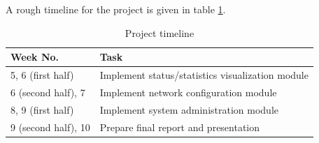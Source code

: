 \documentclass{sig-alternate-05-2015}
\begin{document}
	A rough timeline for the project is given in table \ref{table:timeline}.
	
	\begin{table}[h]
		\centering
		\caption{Project timeline}
		\label{table:timeline}
		\begin{tabular}{p{3cm}|p{5cm}} \hline
			Week No. & Task \\ \hline
			5, 6 (first half) & Implement status/statistics visualization module \\ \hline
			6 (second half), 7 & Implement network configuration module \\ \hline
			8, 9 (first half) & Implement system administration module \\ \hline
			9 (second half), 10 & Prepare final report and presentation \\
			\hline\end{tabular}
	\end{table}
	
  
  
\end{document}
